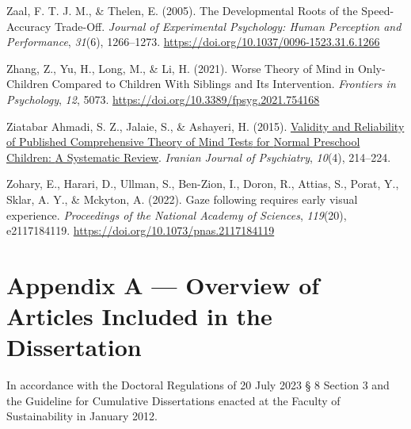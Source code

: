 \documentclass[
]{scrbook}
\newlength{\cslhangindent}
\newenvironment{CSLReferences}[2] %
 {\begin{list}{}{%
  \setlength{\itemindent}{0pt}
  \setlength{\leftmargin}{0pt}
  \setlength{\parsep}{0pt}
  \ifodd #1
   \setlength{\leftmargin}{\cslhangindent}
   \setlength{\itemindent}{-1\cslhangindent}
  \fi
  \setlength{\itemsep}{#2\baselineskip}}}
 {\end{list}}
\begin{document}
\begin{CSLReferences}{1}{0}
Zaal, F. T. J. M., \& Thelen, E. (2005). The {Developmental Roots} of the {Speed-Accuracy Trade-Off}. \emph{Journal of Experimental Psychology: Human Perception and Performance}, \emph{31}(6), 1266--1273. \url{https://doi.org/10.1037/0096-1523.31.6.1266}

Zhang, Z., Yu, H., Long, M., \& Li, H. (2021). Worse {Theory} of {Mind} in {Only-Children Compared} to {Children With Siblings} and {Its Intervention}. \emph{Frontiers in Psychology}, \emph{12}, 5073. \url{https://doi.org/10.3389/fpsyg.2021.754168}

Ziatabar Ahmadi, S. Z., Jalaie, S., \& Ashayeri, H. (2015). \href{https://www.ncbi.nlm.nih.gov/pmc/articles/PMC4801491}{Validity and {Reliability} of {Published Comprehensive Theory} of {Mind Tests} for {Normal Preschool Children}: {A Systematic Review}}. \emph{Iranian Journal of Psychiatry}, \emph{10}(4), 214--224.

Zohary, E., Harari, D., Ullman, S., Ben-Zion, I., Doron, R., Attias, S., Porat, Y., Sklar, A. Y., \& Mckyton, A. (2022). Gaze following requires early visual experience. \emph{Proceedings of the National Academy of Sciences}, \emph{119}(20), e2117184119. \url{https://doi.org/10.1073/pnas.2117184119}

\end{CSLReferences}

\chapter{Appendix A --- Overview of Articles Included in the Dissertation}\label{appendixA}

In accordance with the Doctoral Regulations of 20 July 2023 § 8 Section 3 and the Guideline for Cumulative Dissertations enacted at the Faculty of Sustainability in January 2012.
\end{document}
